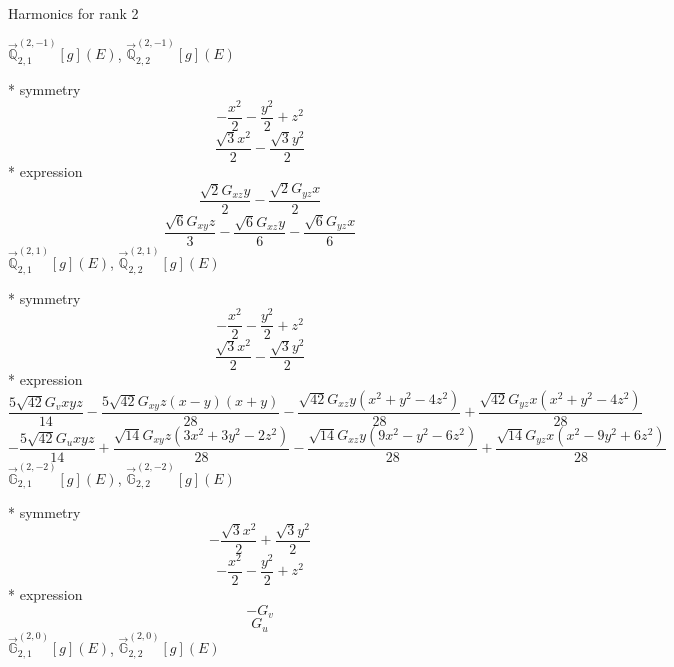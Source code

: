 \documentclass[fleqn,8pt]{jsarticle}
\begin{document}
\noindent * Harmonics for rank 2

\noindent\quad $\vec{\mathbb{Q}}_{2,1}^{(2,-1)}[g](E)$, $\vec{\mathbb{Q}}_{2,2}^{(2,-1)}[g](E)$

\noindent\quad ** symmetry
\begin{dmath*}
- \frac{x^{2}}{2} - \frac{y^{2}}{2} + z^{2}
\end{dmath*}
\begin{dmath*}
\frac{\sqrt{3} x^{2}}{2} - \frac{\sqrt{3} y^{2}}{2}
\end{dmath*}
\noindent\quad ** expression
\begin{dmath*}
\frac{\sqrt{2} G_{xz} y}{2} - \frac{\sqrt{2} G_{yz} x}{2}
\end{dmath*}
\begin{dmath*}
\frac{\sqrt{6} G_{xy} z}{3} - \frac{\sqrt{6} G_{xz} y}{6} - \frac{\sqrt{6} G_{yz} x}{6}
\end{dmath*}
\noindent\quad $\vec{\mathbb{Q}}_{2,1}^{(2,1)}[g](E)$, $\vec{\mathbb{Q}}_{2,2}^{(2,1)}[g](E)$

\noindent\quad ** symmetry
\begin{dmath*}
- \frac{x^{2}}{2} - \frac{y^{2}}{2} + z^{2}
\end{dmath*}
\begin{dmath*}
\frac{\sqrt{3} x^{2}}{2} - \frac{\sqrt{3} y^{2}}{2}
\end{dmath*}
\noindent\quad ** expression
\begin{dmath*}
\frac{5 \sqrt{42} G_{v} x y z}{14} - \frac{5 \sqrt{42} G_{xy} z \left(x - y\right) \left(x + y\right)}{28} - \frac{\sqrt{42} G_{xz} y \left(x^{2} + y^{2} - 4 z^{2}\right)}{28} + \frac{\sqrt{42} G_{yz} x \left(x^{2} + y^{2} - 4 z^{2}\right)}{28}
\end{dmath*}
\begin{dmath*}
- \frac{5 \sqrt{42} G_{u} x y z}{14} + \frac{\sqrt{14} G_{xy} z \left(3 x^{2} + 3 y^{2} - 2 z^{2}\right)}{28} - \frac{\sqrt{14} G_{xz} y \left(9 x^{2} - y^{2} - 6 z^{2}\right)}{28} + \frac{\sqrt{14} G_{yz} x \left(x^{2} - 9 y^{2} + 6 z^{2}\right)}{28}
\end{dmath*}
\noindent\quad $\vec{\mathbb{G}}_{2,1}^{(2,-2)}[g](E)$, $\vec{\mathbb{G}}_{2,2}^{(2,-2)}[g](E)$

\noindent\quad ** symmetry
\begin{dmath*}
- \frac{\sqrt{3} x^{2}}{2} + \frac{\sqrt{3} y^{2}}{2}
\end{dmath*}
\begin{dmath*}
- \frac{x^{2}}{2} - \frac{y^{2}}{2} + z^{2}
\end{dmath*}
\noindent\quad ** expression
\begin{dmath*}
- G_{v}
\end{dmath*}
\begin{dmath*}
G_{u}
\end{dmath*}
\noindent\quad $\vec{\mathbb{G}}_{2,1}^{(2,0)}[g](E)$, $\vec{\mathbb{G}}_{2,2}^{(2,0)}[g](E)$
\end{document}
